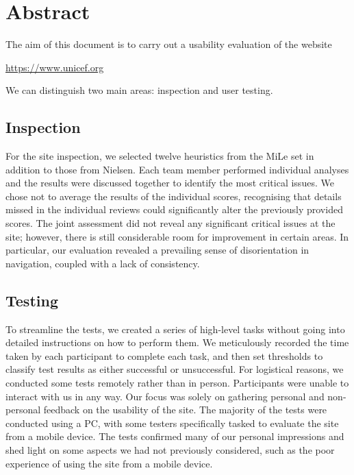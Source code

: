\section{Abstract}
The aim of this document is to carry out a usability evaluation of the website
\begin{center}
    \url{https://www.unicef.org}
\end{center}
We can distinguish two main areas: inspection and user testing. 
\subsection{Inspection}
For the site inspection, we selected twelve heuristics from the MiLe set in addition to those from Nielsen.
Each team member performed individual analyses and the results were discussed together to identify the most critical issues.
We chose not to average the results of the individual scores, recognising that details missed in the individual reviews could significantly alter the previously provided scores.
The joint assessment did not reveal any significant critical issues at the site; however, there is still considerable room for improvement in certain areas.
In particular, our evaluation revealed a prevailing sense of disorientation in navigation, coupled with a lack of consistency.

\subsection{Testing}
To streamline the tests, we created a series of high-level tasks without going into detailed instructions on how to perform them. 
We meticulously recorded the time taken by each participant to complete each task, and then set thresholds to classify test results as either successful or unsuccessful. 
For logistical reasons, we conducted some tests remotely rather than in person.
Participants were unable to interact with us in any way. Our focus was solely on gathering personal and non-personal feedback on the usability of the site.
The majority of the tests were conducted using a PC, with some testers specifically tasked to evaluate the site from a mobile device.
The tests confirmed many of our personal impressions and shed light on some aspects we had not previously considered, such as the poor experience of using the site from a mobile device.